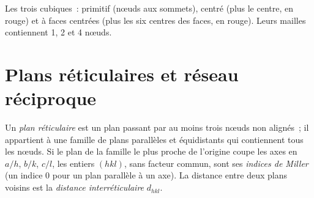 \begin{omfigure}

{\small Les trois  cubiques~: primitif (nœuds aux
sommets), centré (plus le centre, en rouge) et à faces centrées (plus
les six centres des faces, en rouge). Leurs mailles contiennent 1, 2 et
4 nœuds.}
\end{omfigure}

\section{Plans réticulaires et réseau réciproque}

\begin{definition}\label{def:b3:x-ray-diffraction:miller}
Un \emph{plan réticulaire} est un
plan passant par au moins trois nœuds non alignés~; il appartient à une
famille de plans parallèles et équidistants qui contiennent tous les
nœuds. Si le plan de la famille le plus proche de l'origine coupe les
axes en $a/h$, $b/k$, $c/l$, les entiers $(hkl)$, sans facteur commun,
sont ses \emph{indices de Miller} (un indice 0
pour un plan parallèle à un axe). La distance entre deux plans voisins
est la \emph{distance interréticulaire} $d_{hkl}$.
\end{definition}

